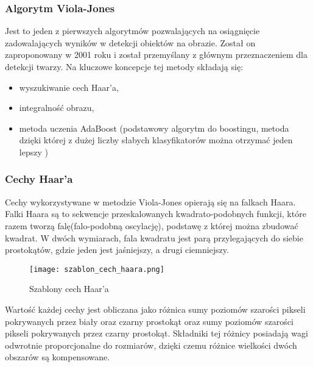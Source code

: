 \subsubsection{Algorytm Viola-Jones}
Jest to jeden z pierwszych algorytmów pozwalających na osiągnięcie zadowalających wyników w detekcji obiektów na obrazie. Został on zaproponowany w 2001 roku i został przemyślany z głównym przeznaczeniem dla detekcji twarzy. Na kluczowe koncepcje tej metody składają się:
\begin{itemize}
\item wyszukiwanie cech Haar'a,
\item integralność obrazu,
\item metoda uczenia AdaBoost (podstawowy algorytm do boostingu, metoda dzięki której z dużej liczby słabych klasyfikatorów można otrzymać jeden lepszy )
\end{itemize}

\subsubsection{Cechy Haar'a}
Cechy wykorzystywane w metodzie Viola-Jones opierają się na falkach Haara. Falki Haara są to sekwencje przeskalowanych kwadrato-podobnych funkcji, które razem tworzą falę(falo-podobną oscylację), podstawę z której można zbudować kwadrat. W dwóch wymiarach, fala kwadratu jest parą przylegających do siebie prostokątów, gdzie jeden jest jaśniejszy, a drugi ciemniejszy.
\begin{figure}[H]
	\centering
	\texttt{[image: szablon\_cech\_haara.png]}
	\caption{Szablony cech Haar'a}
	\label{fig:szablon_cech_haara}
\end{figure}
Wartość każdej cechy jest obliczana jako różnica sumy poziomów szarości pikseli pokrywanych przez biały oraz czarny prostokąt oraz sumy poziomów szarości pikseli pokrywanych przez czarny prostokąt. Składniki tej różnicy posiadają wagi odwrotnie proporcjonalne do rozmiarów, dzięki czemu różnice wielkości dwóch obszarów są kompensowane.

